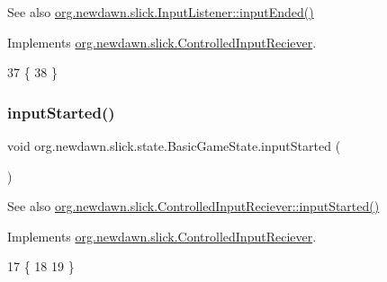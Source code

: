 \begin{DoxySeeAlso}{See also}
\mbox{\hyperlink{interfaceorg_1_1newdawn_1_1slick_1_1_controlled_input_reciever_a61c6cde7cbf28a6969cafe3ec4f1c121}{org.\+newdawn.\+slick.\+Input\+Listener\+::input\+Ended()}} 
\end{DoxySeeAlso}


Implements \mbox{\hyperlink{interfaceorg_1_1newdawn_1_1slick_1_1_controlled_input_reciever_a61c6cde7cbf28a6969cafe3ec4f1c121}{org.\+newdawn.\+slick.\+Controlled\+Input\+Reciever}}.


\begin{DoxyCode}
37                              \{
38     \}
\end{DoxyCode}
\mbox{\label{classorg_1_1newdawn_1_1slick_1_1state_1_1_basic_game_state_aa746c5cf910eadbcb06bc5fc50030054}} 
\subsubsection{\texorpdfstring{input\+Started()}{inputStarted()}}
{\footnotesize\ttfamily void org.\+newdawn.\+slick.\+state.\+Basic\+Game\+State.\+input\+Started (\begin{DoxyParamCaption}{ }\end{DoxyParamCaption})\hspace{0.3cm}{\ttfamily [inline]}}

\begin{DoxySeeAlso}{See also}
\mbox{\hyperlink{interfaceorg_1_1newdawn_1_1slick_1_1_controlled_input_reciever_a718de21e9cd22f4c48ee87b5b8b32ed6}{org.\+newdawn.\+slick.\+Controlled\+Input\+Reciever\+::input\+Started()}} 
\end{DoxySeeAlso}


Implements \mbox{\hyperlink{interfaceorg_1_1newdawn_1_1slick_1_1_controlled_input_reciever_a718de21e9cd22f4c48ee87b5b8b32ed6}{org.\+newdawn.\+slick.\+Controlled\+Input\+Reciever}}.


\begin{DoxyCode}
17                                \{
18         
19     \}
\end{DoxyCode}
\mbox{\label{classorg_1_1newdawn_1_1slick_1_1state_1_1_basic_game_state_adc09c433d4eb497616ac73c55b8b6c7d}} 
